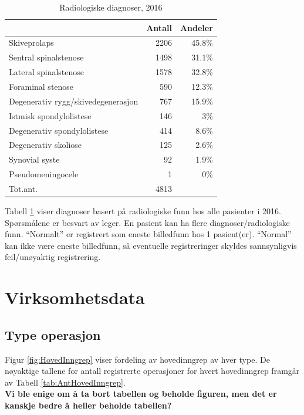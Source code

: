 \documentclass [norsk,a4paper,twoside]{article}\usepackage[]{graphicx}\usepackage[]{color}
\begin{document}
\begin{table}[ht]
\centering
\begin{tabular}{lrr}
  \hline
 & Antall & Andeler \\ 
  \hline
Skiveprolaps & 2206 & 45.8\% \\ 
  Sentral spinalstenose & 1498 & 31.1\% \\ 
  Lateral spinalstenose & 1578 & 32.8\% \\ 
  Foraminal stenose & 590 & 12.3\% \\ 
  Degenerativ rygg/skivedegenerasjon & 767 & 15.9\% \\ 
  Istmisk spondylolistese & 146 & 3\% \\ 
  Degenerativ spondylolistese & 414 & 8.6\% \\ 
  Degenerativ skoliose & 125 & 2.6\% \\ 
  Synovial syste & 92 & 1.9\% \\ 
  Pseudomeningocele & 1 & 0\% \\ 
  Tot.ant. & 4813 &   \\ 
   \hline
\end{tabular}
\caption{Radiologiske diagnoser, 2016} 
\label{tab:RF}
\end{table}


Tabell \ref{tab:RF} viser diagnoser basert på radiologiske funn hos alle pasienter 
i 2016. 
Spørsmålene er besvart av leger.
En pasient kan ha flere diagnoser/radiologiske funn.
``Normalt'' er registrert som eneste billedfunn hos 1 pasient(er).
      ``Normal'' kan ikke være eneste billedfunn, så eventuelle registreringer skyldes sannsynligvis 
      feil/unøyaktig registrering.



\clearpage

\section{Virksomhetsdata}

\subsection{Type operasjon}

Figur \ref{fig:HovedInngrep} viser fordeling av hovedinngrep av hver type.
De nøyaktige tallene for antall registrerte operasjoner for hvert hovedinngrep 
framgår av Tabell \ref{tab:AntHovedInngrep}. \\
\textbf{Vi ble enige om å ta bort tabellen og beholde figuren, men det er kanskje bedre å heller beholde tabellen?}
\end{document}
